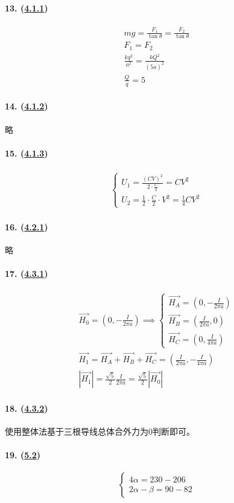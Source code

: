 \paragraph{13. (\hyperref[subsec:4.1.1]{4.1.1})}

\begin{gather*}
    mg=\frac{F_1}{\tan\theta}=\frac{F_2}{\tan\theta}\\
    F_1=F_2\\
    \frac{kq^2}{a^2}=\frac{kQ^2}{(5a)^2}\\
    \frac{Q}{q}=5
\end{gather*}

\paragraph{14. (\hyperref[subsec:4.1.2]{4.1.2})} 略
\paragraph{15. (\hyperref[subsec:4.1.3]{4.1.3})}

\begin{gather*}
    \begin{cases}
        U_1=\frac{(CV)^2}{2\cdot\frac{C}{2}}=CV^2\\
        U_2=\frac12\cdot\frac{C}{2}\cdot V^2=\frac14CV^2
    \end{cases}
\end{gather*}

\paragraph{16. (\hyperref[subsec:4.2.1]{4.2.1})} 略
\paragraph{17. (\hyperref[subsec:4.3.1]{4.3.1})}

\begin{gather*}
    \vec{H_0}=\left(0,-\frac{I}{2\pi a}\right)\implies
    \begin{cases}
        \vec{H_A}=\left(0,-\frac{I}{2\pi a}\right)\\
        \vec{H_B}=\left(\frac{I}{2\pi a},0\right)\\
        \vec{H_C}=\left(0,\frac{I}{4\pi a}\right)
    \end{cases}\\
    \vec{H_1}=\vec{H_A}+\vec{H_B}+\vec{H_C}=\left(\frac{I}{2\pi a},-\frac{I}{4\pi a}\right)\\
    |\vec{H_1}|=\frac{\sqrt{5}}{2}\frac{I}{2\pi a}=\frac{\sqrt{5}}{2}|\vec{H_0}|
\end{gather*}

\paragraph{18. (\hyperref[subsec:4.3.2]{4.3.2})} 使用整体法基于三根导线总体合外力为0判断即可。
\paragraph{19. (\hyperref[sec:5.2]{5.2})}

\begin{equation*}
    \begin{cases}
        4\alpha=230-206\\
        2\alpha-\beta=90-82
    \end{cases}
\end{equation*}
